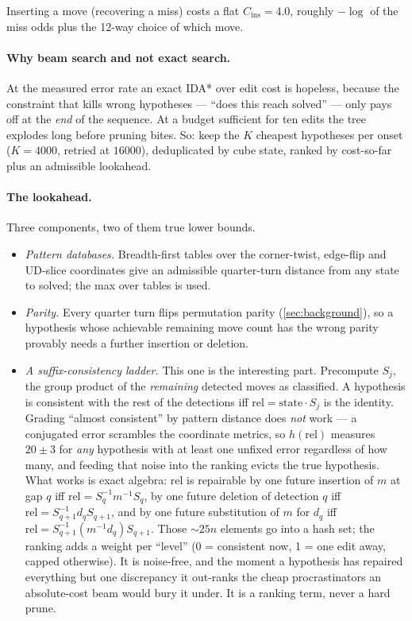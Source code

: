 Inserting a move (recovering a miss) costs a flat $C_{\mathrm{ins}} = 4.0$,
roughly $-\log$ of the miss odds plus the 12-way choice of which move.

\paragraph{Why beam search and not exact search.} At the measured error rate
an exact IDA* over edit cost is hopeless, because the constraint that kills
wrong hypotheses --- ``does this reach solved'' --- only pays off at the
\emph{end} of the sequence. At a budget sufficient for ten edits the tree
explodes long before pruning bites. So: keep the $K$ cheapest hypotheses per
onset ($K = 4000$, retried at $16000$), deduplicated by cube state, ranked
by cost-so-far plus an admissible lookahead.

\paragraph{The lookahead.}
\label{sec:heuristic}
Three components, two of them true lower bounds.
\begin{itemize}[leftmargin=1.3em,itemsep=2pt]
\item \emph{Pattern databases.} Breadth-first tables over the corner-twist,
edge-flip and UD-slice coordinates give an admissible quarter-turn distance
from any state to solved; the max over tables is used.
\item \emph{Parity.} Every quarter turn flips permutation parity
(\cref{sec:background}), so a hypothesis whose achievable remaining move
count has the wrong parity provably needs a further insertion or deletion.
\item \emph{A suffix-consistency ladder.} This one is the interesting part.
Precompute $S_j$, the group product of the \emph{remaining} detected moves as
classified. A hypothesis is consistent with the rest of the detections iff
$\mathrm{rel} = \mathrm{state}\cdot S_j$ is the identity. Grading ``almost
consistent'' by pattern distance does \emph{not} work --- a conjugated error
scrambles the coordinate metrics, so $h(\mathrm{rel})$ measures $20\pm3$ for
\emph{any} hypothesis with at least one unfixed error regardless of how many,
and feeding that noise into the ranking evicts the true hypothesis. What
works is exact algebra: $\mathrm{rel}$ is repairable by one future insertion
of $m$ at gap $q$ iff $\mathrm{rel} = S_q^{-1} m^{-1} S_q$, by one future
deletion of detection $q$ iff $\mathrm{rel} = S_{q+1}^{-1} d_q S_{q+1}$, and
by one future substitution of $m$ for $d_q$ iff
$\mathrm{rel} = S_{q+1}^{-1}(m^{-1}d_q)S_{q+1}$. Those $\sim\!25n$ elements
go into a hash set; the ranking adds a weight per ``level'' (0 = consistent
now, 1 = one edit away, capped otherwise). It is noise-free, and the moment a
hypothesis has repaired everything but one discrepancy it out-ranks the
cheap procrastinators an absolute-cost beam would bury it under. It is a
ranking term, never a hard prune.
\end{itemize}


